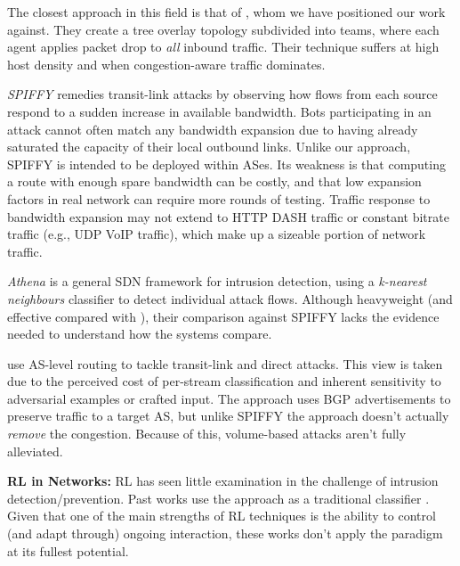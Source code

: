 \documentclass[10pt, times, conference, letterpaper]{IEEEtran}
\newcommand{\fakepara}[1]{\noindent\textbf{#1:}}
\begin{document}
The closest approach in this field is that of \textcite{DBLP:journals/eaai/MalialisK15}, whom we have positioned our work against.
They create a tree overlay topology subdivided into teams, where each agent applies packet drop to \emph{all} inbound traffic.
Their technique suffers at high host density and when congestion-aware traffic dominates.

\emph{SPIFFY} \cite{DBLP:conf/ndss/KangGS16} remedies transit-link attacks by observing how flows from each source respond to a sudden increase in available bandwidth.
Bots participating in an attack cannot often match any bandwidth expansion due to having already saturated the capacity of their local outbound links.
Unlike our approach, SPIFFY is intended to be deployed within ASes.
Its weakness is that computing a route with enough spare bandwidth can be costly, and that low expansion factors in real network can require more rounds of testing. 
Traffic response to bandwidth expansion may not extend to HTTP DASH traffic or constant bitrate traffic (e.g., UDP VoIP traffic), which make up a sizeable portion of network traffic.

\emph{Athena} \cite{DBLP:conf/dsn/LeeKSPY17} is a general SDN framework for intrusion detection, using a \emph{k-nearest neighbours} classifier to detect individual attack flows.
Although heavyweight (and effective compared with \textcite{DBLP:conf/lcn/BragaMP10}), their comparison against SPIFFY lacks the evidence needed to understand how the systems compare.

\Textcite{DBLP:conf/sp/SmithS18} use AS-level routing to tackle transit-link and direct attacks.
This view is taken due to the perceived cost of per-stream classification and inherent sensitivity to adversarial examples or crafted input.
The approach uses BGP advertisements to preserve traffic to a target AS, but unlike SPIFFY the approach doesn't actually \emph{remove} the congestion.
Because of this, volume-based attacks aren't fully alleviated.

\fakepara{RL in Networks}
RL has seen little examination in the challenge of intrusion detection/prevention.
Past works use the approach as a traditional classifier \cite{shamshirband2014anomaly,DBLP:conf/mates/ServinK08}.
Given that one of the main strengths of RL techniques is the ability to control (and adapt through) ongoing interaction, these works don't apply the paradigm at its fullest potential.
\end{document}
